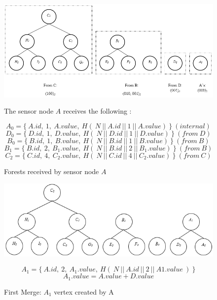 	\begin{figure}[hp]
		\centering
		\includegraphics[scale = 0.7]{images/commitment-tree-example-1.png}\\
		\caption{Forests received by sensor node $A$}
		\label{fig:commitment-tree-example-1}
		The sensor node $A$ receives the following \payloads:

		\begin{equation}
			A_{0} = \{\ A.id,\ 1,\ A.value,\ H  (\ N\ ||\ A.id\ ||\ 1\ ||\ A.value)\ \}\ (internal)
		\end{equation}
		\begin{equation}
			D_{0} = \{\ D.id,\ 1,\ D.value,\ H(\ N\ ||\ D.id\ ||\ 1\ ||\ D.value)\ \}\ (from\ D)
		\end{equation}
		\begin{equation}
			B_{0} = \{\ B.id,\ 1,\ B.value,\ H(\ N\ ||\ B.id\ ||\ 1\ ||\ B.value)\ \}\ (from\ B)
		\end{equation}
		\begin{equation}
			B_{1} = \{\ B.id,\ 2,\ B_{1}.value,\ H(\ N\ ||\ B.id\ ||\ 2\ ||\ B_{1}.value)\ \}\ (from\ B)
		\end{equation}
		\begin{equation}
			C_{2} = \{\ C.id,\ 4,\ C_{2}.value,\ H(\ N\ ||\ C.id\ ||\ 4\ ||\ C_{2}.value)\ \}\ (from\ C)
		\end{equation}
		
	\end{figure}
	
	\begin{figure}[hp]
		\centering
		\includegraphics[scale = 0.7]{images/commitment-tree-example-2.png}\\
		\caption{First Merge: $A_{1}$ vertex created by A}
		\label{fig:commitment-tree-example-2}
		\begin{equation}
			A_{1} = \{\ A.id,\ 2,\ A_{1}.value,\ H(\ N\ ||\ A.id\ ||\ 2\ ||\ A{1}.value\ )\ \}
		\end{equation}
		\begin{equation}
			A_{1}.value = A.value + D.value
		\end{equation}
	\end{figure}


